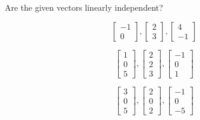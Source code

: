 \documentclass{ximera}
\begin{document}
\begin{problem} Are the given vectors linearly independent?

\begin{problem}\label{prob:linindmultchoice1}
$$\begin{bmatrix}-1\\0\end{bmatrix}, \begin{bmatrix}2\\3\end{bmatrix},\begin{bmatrix}4\\-1\end{bmatrix}$$

\begin{multipleChoice}
 \end{multipleChoice}
\end{problem}

\begin{problem}\label{prob:linindmultchoice2}
$$\begin{bmatrix}1\\0\\5\end{bmatrix}, \begin{bmatrix}2\\2\\3\end{bmatrix},\begin{bmatrix}-1\\0\\1\end{bmatrix}$$

\begin{multipleChoice}
 \end{multipleChoice}

\end{problem}

\begin{problem}\label{prob:linindmultchoice3}
$$\begin{bmatrix}3\\0\\5\end{bmatrix}, \begin{bmatrix}2\\0\\2\end{bmatrix},\begin{bmatrix}-1\\0\\-5\end{bmatrix}$$


\end{problem}
\end{problem}
\end{document}

